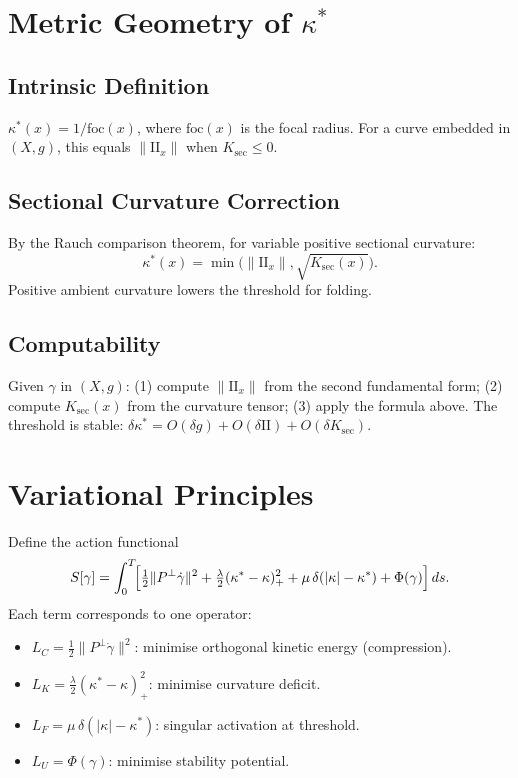 \documentclass[12pt,a4paper]{article}
\begin{document}
\section{Metric Geometry of $\kappa^*$}
\label{sec:kappa}

\subsection{Intrinsic Definition}

$\kappa^*(x) = 1/\mathrm{foc}(x)$, where $\mathrm{foc}(x)$ is the
focal radius.
For a curve embedded in $(X, g)$, this equals $\|\mathrm{II}_x\|$
when $K_\mathrm{sec} \leq 0$.

\subsection{Sectional Curvature Correction}

By the Rauch comparison theorem, for variable positive sectional
curvature:
\[
  \kappa^*(x) = \min\!\bigl(\|\mathrm{II}_x\|,
    \sqrt{K_\mathrm{sec}(x)}\bigr).
\]
Positive ambient curvature lowers the threshold for folding.

\subsection{Computability}

Given $\gamma$ in $(X, g)$:
(1) compute $\|\mathrm{II}_x\|$ from the second fundamental form;
(2) compute $K_\mathrm{sec}(x)$ from the curvature tensor;
(3) apply the formula above.
The threshold is stable:
$\delta\kappa^* = O(\delta g) + O(\delta\mathrm{II}) +
O(\delta K_\mathrm{sec})$.

\section{Variational Principles}
\label{sec:variational}

Define the action functional
\[
  S[\gamma] = \int_0^T \!\Bigl[
    \tfrac{1}{2}\|P^\perp \dot\gamma\|^2
    + \tfrac{\lambda}{2}(\kappa^* - \kappa)_+^2
    + \mu\,\delta(|\kappa| - \kappa^*)
    + \Phi(\gamma)
  \Bigr]\,ds.
\]
Each term corresponds to one operator:
\begin{itemize}[leftmargin=2em]
  \item $L_C = \tfrac{1}{2}\|P^\perp\dot\gamma\|^2$:
    minimise orthogonal kinetic energy (compression).
  \item $L_K = \tfrac{\lambda}{2}(\kappa^* - \kappa)_+^2$:
    minimise curvature deficit.
  \item $L_F = \mu\,\delta(|\kappa| - \kappa^*)$:
    singular activation at threshold.
  \item $L_U = \Phi(\gamma)$: minimise stability potential.
\end{itemize}
\end{document}
